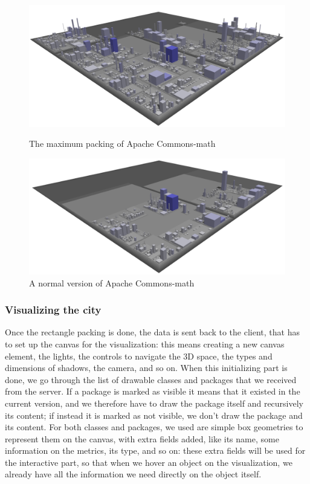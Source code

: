 \documentclass[]{usiinfbachelorproject}
\begin{document}
\begin{figure}[H]
  \centering
  \begin{minipage}[b]{0.49\textwidth}
      \includegraphics[width=1\textwidth]{pictures/maxDrawable1.png}
      \caption{The maximum packing of Apache Commons-math}
      \label{fig:maxPacking}
  \end{minipage}
  \hfill
  \begin{minipage}[b]{0.49\textwidth}
      \includegraphics[width=1\textwidth]{pictures/maxDrawable2.png}
      \caption{A normal version of Apache Commons-math}
      \label{fig:maxPacking2}
  \end{minipage}
\end{figure}


\subsubsection{Visualizing the city} \label{Visualizing the city}
Once the rectangle packing is done, the data is sent back to the client, that has to set up the canvas for the visualization: this means creating a new canvas element, the lights, the controls to navigate the 3D space, the types and dimensions of shadows, the camera, and so on.
When this initializing part is done, we go through the list of drawable classes and packages that we received from the server. If a package is marked as visible it means that it existed in the current version, and we therefore have to draw the package itself and recursively its content; if instead it is marked as not visible, we don't draw the package and its content.
For both classes and packages, we used are simple box geometries to represent them on the canvas, with extra fields added, like its name, some information on the metrics, its type, and so on: these extra fields will be used for the interactive part, so that when we hover an object on the visualization, we already have all the information we need directly on the object itself.
\end{document}
